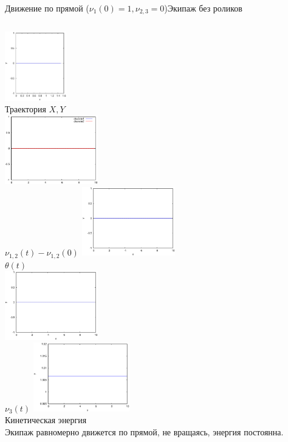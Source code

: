\documentclass{beamer}
\begin{document}
\begin{frame}{Движение по прямой ($\nu_1(0) = 1, \nu_{2,3} = 0$)}{Экипаж без роликов}
    \begin{columns}
            \centering
            \includegraphics[width=\linewidth, height=30mm]{_old_sol__1_0_0__0__10__1e2_trajectory} \\
            Траектория $X, Y$ \\
            \includegraphics[width=\linewidth, height=30mm]{_old_sol__1_0_0__0__10__1e2_nu12_centered} \\
            $\nu_{1,2}(t) - \nu_{1,2}(0)$
            \centering
            \includegraphics[width=\linewidth, height=30mm]{_old_sol__1_0_0__0__10__1e2_theta} \\
            $\theta(t)$ \\
            \includegraphics[width=\linewidth, height=30mm]{_old_sol__1_0_0__0__10__1e2_nu3} \\
            $\nu_3(t)$
            \centering
            \includegraphics[width=\linewidth, height=30mm]{_old_sol__1_0_0__0__10__1e2_kin_en} \\
            Кинетическая энергия \\
            \vspace{15pt}
            Экипаж равномерно движется по прямой, не вращаясь, энергия постоянна.
    \end{columns}
\end{frame}
\end{document}
